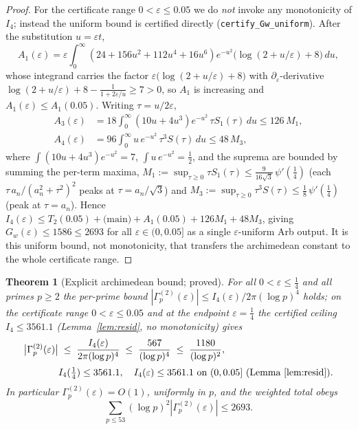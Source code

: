 \documentclass[11pt]{article}
\newtheorem{theorem}{Theorem}[section]
\newcommand{\Gp}{\Gamma_p^{(2)}}            %
\begin{document}
\begin{proof}
For the certificate range $0<\varepsilon\le 0.05$ we do \emph{not} invoke any
monotonicity of $I_4$; instead the uniform bound is certified directly
(\texttt{certify\_Gw\_uniform}). After the substitution $u=\varepsilon t$,
\[
A_1(\varepsilon)=\varepsilon\!\int_0^\infty\!\!(24+156u^2+112u^4+16u^6)
e^{-u^2}\bigl(\log(2+u/\varepsilon)+8\bigr)\,du,
\]
whose integrand carries the factor $\varepsilon\bigl(\log(2+u/\varepsilon)+8\bigr)$
with $\partial_\varepsilon$-derivative
$\log(2+u/\varepsilon)+8-\tfrac{1}{1+2\varepsilon/u}\ge 7>0$, so $A_1$ is
increasing and $A_1(\varepsilon)\le A_1(0.05)$. Writing $\tau=u/2\varepsilon$,
\[
\begin{aligned}
A_3(\varepsilon)&=18\!\int_0^\infty\!\!(10u+4u^3)e^{-u^2}\,\tau S_1(\tau)\,du
\le 126\,M_1,\\
A_4(\varepsilon)&=96\!\int_0^\infty\!\! u\,e^{-u^2}\,\tau^3 S(\tau)\,du
\le 48\,M_3,
\end{aligned}
\]
where $\int(10u+4u^3)e^{-u^2}=7$, $\int u\,e^{-u^2}=\tfrac12$, and the suprema
are bounded by summing the per-term maxima,
$M_1:=\sup_{\tau\ge0}\tau S_1(\tau)\le\tfrac{9}{16\sqrt3}\,\psi'(\tfrac14)$
(each $\tau\,a_n/(a_n^2+\tau^2)^2$ peaks at $\tau=a_n/\sqrt3$) and
$M_3:=\sup_{\tau\ge0}\tau^3 S(\tau)\le\tfrac18\,\psi'(\tfrac14)$ (peak at
$\tau=a_n$). Hence $I_4(\varepsilon)\le T_2(0.05)+\text{(main)}+A_1(0.05)
+126M_1+48M_3$, giving $G_w(\varepsilon)\le 1586\le 2693$ for all
$\varepsilon\in(0,0.05]$ as a single $\varepsilon$-uniform Arb output. It is
this uniform bound, not monotonicity, that transfers the archimedean constant
to the whole certificate range.
\end{proof}


\begin{theorem}[Explicit archimedean bound; proved]
\label{thm:arch}
For all $0<\varepsilon\le\tfrac14$ and all primes $p\ge 2$ the per-prime bound
$|\Gp(\varepsilon)|\le I_4(\varepsilon)/2\pi(\log p)^4$ holds; on the certificate
range $0<\varepsilon\le0.05$ and at the endpoint $\varepsilon=\tfrac14$ the
certified ceiling $I_4\le 3561.1$ (Lemma~\ref{lem:resid}, no monotonicity) gives
\[
\begin{aligned}
\bigl|\Gp(\varepsilon)\bigr|
 &\;\le\; \frac{I_4(\varepsilon)}{2\pi(\log p)^4}
 \;\le\; \frac{567}{(\log p)^4}
 \;\le\; \frac{1180}{(\log p)^2},\\[2pt]
&I_4(\tfrac14)\le 3561.1,\quad
I_4(\varepsilon)\le 3561.1\ \text{on }(0,0.05]\ (\text{Lemma~\ref{lem:resid}}).
\end{aligned}
\]
In particular $\Gp(\varepsilon)=O(1)$, uniformly in $p$, and the weighted
total obeys
\[
\sum_{p\le 53}(\log p)^2|\Gp(\varepsilon)|\le 2693 .
\]
\end{theorem}
\end{document}
